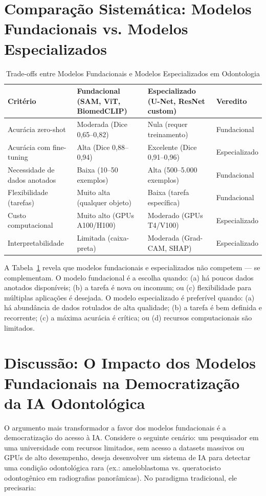 \section{Comparação Sistemática: Modelos Fundacionais vs. Modelos Especializados}

\begin{table}[H]
\centering
\caption{Trade-offs entre Modelos Fundacionais e Modelos Especializados em Odontologia}
\label{tab:foundation-vs-specialized}
\begin{tabular}{p{2.5cm}p{2.8cm}p{2.8cm}p{3cm}}
\toprule
\textbf{Critério} & \textbf{Fundacional (SAM, ViT, BiomedCLIP)} & \textbf{Especializado (U-Net, ResNet custom)} & \textbf{Veredito} \\
\midrule
Acurácia zero-shot & Moderada (Dice 0,65--0,82) & Nula (requer treinamento) & Fundacional \\
Acurácia com fine-tuning & Alta (Dice 0,88--0,94) & Excelente (Dice 0,91--0,96) & Especializado \\
Necessidade de dados anotados & Baixa (10--50 exemplos) & Alta (500--5.000 exemplos) & Fundacional \\
Flexibilidade (tarefas) & Muito alta (qualquer objeto) & Baixa (tarefa específica) & Fundacional \\
Custo computacional & Muito alto (GPUs A100/H100) & Moderado (GPUs T4/V100) & Especializado \\
Interpretabilidade & Limitada (caixa-preta) & Moderada (Grad-CAM, SHAP) & Especializado \\
\bottomrule
\end{tabular}
\end{table}

A Tabela~\ref{tab:foundation-vs-specialized} revela que modelos fundacionais e especializados não competem --- se complementam. O modelo fundacional é a escolha quando: (a) há poucos dados anotados disponíveis; (b) a tarefa é nova ou incomum; ou (c) flexibilidade para múltiplas aplicações é desejada. O modelo especializado é preferível quando: (a) há abundância de dados rotulados de alta qualidade; (b) a tarefa é bem definida e recorrente; (c) a máxima acurácia é crítica; ou (d) recursos computacionais são limitados.

\section{Discussão: O Impacto dos Modelos Fundacionais na Democratização da IA Odontológica}

O argumento mais transformador a favor dos modelos fundacionais é a democratização do acesso à IA. Considere o seguinte cenário: um pesquisador em uma universidade com recursos limitados, sem acesso a datasets massivos ou GPUs de alto desempenho, deseja desenvolver um sistema de IA para detectar uma condição odontológica rara (ex.: ameloblastoma vs. queratocisto odontogênico em radiografias panorâmicas). No paradigma tradicional, ele precisaria:

